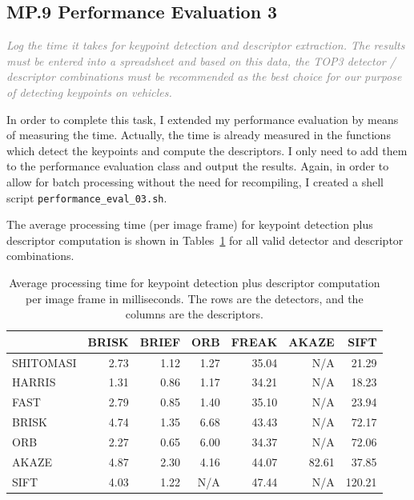 \documentclass[a4paper]{scrartcl}
\begin{document}
\subsection*{MP.9 Performance Evaluation 3}
\textcolor{gray}{\textit{Log the time it takes for keypoint detection and descriptor extraction. The results must be entered into a spreadsheet and based on this data, the TOP3 detector / descriptor combinations must be recommended as the best choice for our purpose of detecting keypoints on vehicles.}}

In order to complete this task, I extended my performance evaluation by means of measuring the time.
Actually, the time is already measured in the functions which detect the keypoints and compute
the descriptors. I only need to add them to the performance evaluation class and output the results.
Again, in order to allow for batch processing without the need for recompiling,
I created a shell script \texttt{performance\_eval\_03.sh}.

The average processing time (per image frame) for keypoint detection plus descriptor computation
is shown in Tables~\ref{tab:performance_3}
for all valid detector and descriptor combinations.

\begin{table}
	\caption{Average processing time for keypoint detection plus descriptor computation
		per image frame in milliseconds.
		The rows are the detectors, and the columns are the descriptors.}
	\label{tab:performance_3}
	\begin{tabular}{l||r|r|r|r|r|r}
		 			& BRISK & BRIEF & ORB & FREAK 	& AKAZE & SIFT		\\
		\hline \hline
		SHITOMASI 	& 2.73	& 1.12	& 1.27	& 35.04	& N/A 	& 21.29 	\\
		HARRIS 		& 1.31	& 0.86	& 1.17	& 34.21	& N/A 	& 18.23 	\\
		FAST 		& 2.79	& 0.85	& 1.40	& 35.10	& N/A 	& 23.94 	\\
		BRISK 		& 4.74	& 1.35 	& 6.68	& 43.43	& N/A 	& 72.17 	\\
		ORB 		& 2.27	& 0.65	& 6.00	& 34.37	& N/A 	& 72.06 	\\
		AKAZE 		& 4.87	& 2.30	& 4.16	& 44.07	& 82.61	& 37.85 	\\
		SIFT 		& 4.03	& 1.22	& N/A 	& 47.44	& N/A 	& 120.21 	\\
		\hline
	\end{tabular}
\end{table}
\end{document}
